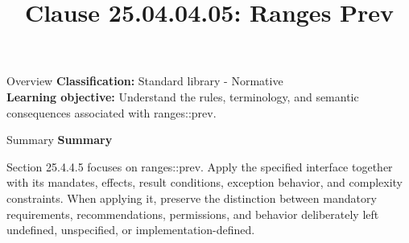 \documentclass[10pt,letterpaper]{article}
\title{Clause 25.04.04.05: Ranges Prev}
\author{}
\date{}
\begin{document}
\maketitle
\begin{CornellOverviewBox}{Overview}
\textbf{Classification:} Standard library - Normative\\[2pt]
\textbf{Learning objective:} Understand the rules, terminology, and semantic consequences associated with ranges::prev.
\end{CornellOverviewBox}\begin{CornellSummaryBox}{Summary}
{\sffamily\bfseries\color{Accent} Summary}\par\vspace{3pt}Section 25.4.4.5 focuses on ranges::prev. Apply the specified interface together with its mandates, effects, result conditions, exception behavior, and complexity constraints. When applying it, preserve the distinction between mandatory requirements, recommendations, permissions, and behavior deliberately left undefined, unspecified, or implementation-defined.
\end{CornellSummaryBox}
\end{document}
